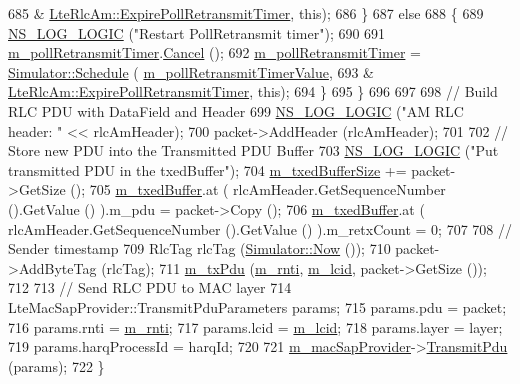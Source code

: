 \begin{DoxyCode}
685                                                        &
      \hyperlink{classns3_1_1LteRlcAm_a1fa21fbf53996368b8aeea6ed63f5c53}{LteRlcAm::ExpirePollRetransmitTimer}, \textcolor{keyword}{this});
686         \}
687       \textcolor{keywordflow}{else}
688         \{
689           \hyperlink{group__logging_ga88acd260151caf2db9c0fc84997f45ce}{NS\_LOG\_LOGIC} (\textcolor{stringliteral}{"Restart PollRetransmit timer"});
690 
691           \hyperlink{classns3_1_1LteRlcAm_a9b34f6f4c6993ae026b95be1f63aacfa}{m\_pollRetransmitTimer}.\hyperlink{classns3_1_1EventId_a993ae94e48e014e1afd47edb16db7a11}{Cancel} ();
692           \hyperlink{classns3_1_1LteRlcAm_a9b34f6f4c6993ae026b95be1f63aacfa}{m\_pollRetransmitTimer} = \hyperlink{classns3_1_1Simulator_a671882c894a08af4a5e91181bf1eec13}{Simulator::Schedule} (
      \hyperlink{classns3_1_1LteRlcAm_ad007e35ba39e42ed6438d9a15c9e31df}{m\_pollRetransmitTimerValue},
693                                                        &
      \hyperlink{classns3_1_1LteRlcAm_a1fa21fbf53996368b8aeea6ed63f5c53}{LteRlcAm::ExpirePollRetransmitTimer}, \textcolor{keyword}{this});
694         \}
695     \}
696 
697 
698   \textcolor{comment}{// Build RLC PDU with DataField and Header}
699   \hyperlink{group__logging_ga88acd260151caf2db9c0fc84997f45ce}{NS\_LOG\_LOGIC} (\textcolor{stringliteral}{"AM RLC header: "} << rlcAmHeader);
700   packet->AddHeader (rlcAmHeader);
701 
702   \textcolor{comment}{// Store new PDU into the Transmitted PDU Buffer}
703   \hyperlink{group__logging_ga88acd260151caf2db9c0fc84997f45ce}{NS\_LOG\_LOGIC} (\textcolor{stringliteral}{"Put transmitted PDU in the txedBuffer"});
704   \hyperlink{classns3_1_1LteRlcAm_add3fe05a0fd3a4ad1fcb7db0239c698f}{m\_txedBufferSize} += packet->GetSize ();
705   \hyperlink{classns3_1_1LteRlcAm_afabb45c6de7da492347b45c139de0c28}{m\_txedBuffer}.at ( rlcAmHeader.GetSequenceNumber ().GetValue () ).m\_pdu = packet->Copy ();
706   \hyperlink{classns3_1_1LteRlcAm_afabb45c6de7da492347b45c139de0c28}{m\_txedBuffer}.at ( rlcAmHeader.GetSequenceNumber ().GetValue () ).m\_retxCount = 0;
707 
708   \textcolor{comment}{// Sender timestamp}
709   RlcTag rlcTag (\hyperlink{classns3_1_1Simulator_ac3178fa975b419f7875e7105be122800}{Simulator::Now} ());
710   packet->AddByteTag (rlcTag);
711   \hyperlink{classns3_1_1LteRlc_aa14f9d8b8828d0b0859f1870ae1248e6}{m\_txPdu} (\hyperlink{classns3_1_1LteRlc_a48ab0a78e7f2687337075b1c8832df70}{m\_rnti}, \hyperlink{classns3_1_1LteRlc_a051085e9b27883e7ba4b98ad7242fd8a}{m\_lcid}, packet->GetSize ());
712 
713   \textcolor{comment}{// Send RLC PDU to MAC layer}
714   LteMacSapProvider::TransmitPduParameters params;
715   params.pdu = packet;
716   params.rnti = \hyperlink{classns3_1_1LteRlc_a48ab0a78e7f2687337075b1c8832df70}{m\_rnti};
717   params.lcid = \hyperlink{classns3_1_1LteRlc_a051085e9b27883e7ba4b98ad7242fd8a}{m\_lcid};
718   params.layer = layer;
719   params.harqProcessId = harqId;
720 
721   \hyperlink{classns3_1_1LteRlc_a69272d17c4e48183bb89b8dd0660c1be}{m\_macSapProvider}->\hyperlink{classns3_1_1LteMacSapProvider_a125622cc614fa4ef620d595fbec0cf07}{TransmitPdu} (params);
722 \}
\end{DoxyCode}


